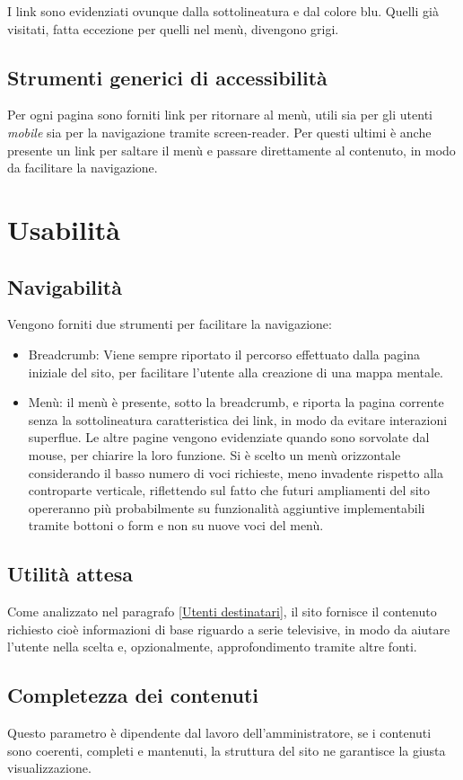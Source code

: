 \documentclass{tecweb}
\begin{document}
	I link sono evidenziati ovunque dalla sottolineatura e dal colore blu. Quelli già visitati, fatta eccezione per quelli nel menù, divengono grigi. 
	\subsection{Strumenti generici di accessibilità}
	Per ogni pagina sono forniti link per ritornare al menù, utili sia per gli utenti \textit{mobile} sia per la navigazione tramite screen-reader. Per questi ultimi è anche presente un link per saltare il menù e passare direttamente al contenuto, in modo da facilitare la navigazione.
	\newpage
	\section{Usabilità}
	
	\subsection{Navigabilità}
	Vengono forniti due strumenti per facilitare la navigazione:
	\begin{itemize}
		\item Breadcrumb: Viene sempre riportato il percorso effettuato dalla pagina iniziale del sito, per facilitare l'utente alla creazione di una mappa mentale.
		\item Menù: il menù è presente, sotto la breadcrumb, e riporta la pagina corrente senza la sottolineatura caratteristica dei link, in modo da evitare interazioni superflue. Le altre pagine vengono evidenziate quando sono sorvolate dal mouse, per chiarire la loro funzione. Si è scelto un menù orizzontale considerando il basso numero di voci richieste, meno invadente rispetto alla controparte verticale, riflettendo sul fatto che futuri ampliamenti del sito opereranno più probabilmente su funzionalità aggiuntive implementabili tramite bottoni o form e non su nuove voci del menù.
	\end{itemize}
	\subsection{Utilità attesa}
	Come analizzato nel paragrafo \ref{Utenti destinatari}, il sito fornisce il contenuto richiesto cioè informazioni di base riguardo a serie televisive, in modo da aiutare l'utente nella scelta e, opzionalmente, approfondimento tramite altre fonti.
	\subsection{Completezza dei contenuti}
	Questo parametro è dipendente dal lavoro dell'amministratore, se i contenuti sono coerenti, completi e mantenuti, la struttura del sito ne garantisce la giusta visualizzazione.
\end{document}
